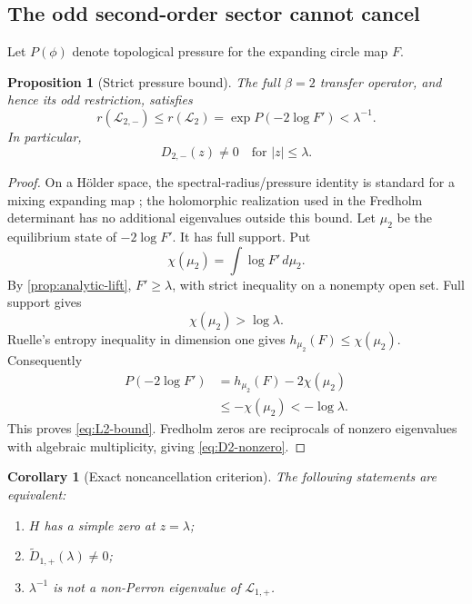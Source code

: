 \documentclass[11pt]{article}
\newtheorem{proposition}[theorem]{Proposition}
\newtheorem{corollary}[theorem]{Corollary}
\theoremstyle{definition}
\theoremstyle{remark}
\newcommand{\cL}{\mathcal L}
\begin{document}
\subsection{The odd second-order sector cannot cancel}

Let $P(\phi)$ denote topological pressure for the expanding circle map $F$.

\begin{proposition}[Strict pressure bound]
\label{prop:pressure-bound}
The full $\beta=2$ transfer operator, and hence its odd restriction, satisfies
\begin{equation}\label{eq:L2-bound}
 r(\cL_{2,-})\le r(\cL_2)
 =\exp P(-2\log F')<\lambda^{-1}.
\end{equation}
In particular,
\begin{equation}\label{eq:D2-nonzero}
 D_{2,-}(z)\ne0\quad\text{for }|z|\le\lambda.
\end{equation}
\end{proposition}

\begin{proof}
On a H\"older space, the spectral-radius/pressure identity is standard for a
mixing expanding map \citep{Ruelle1989,Baladi2000}; the holomorphic
realization used in the Fredholm determinant has no additional eigenvalues
outside this bound.  Let $\mu_2$ be the
equilibrium state of $-2\log F'$.  It has full support.  Put
\begin{equation}\label{eq:chi}
 \chi(\mu_2)=\int\log F'\,d\mu_2.
\end{equation}
By \cref{prop:analytic-lift}, $F'\ge\lambda$, with strict inequality on a
nonempty open set.  Full support gives
\begin{equation}\label{eq:strict-chi}
 \chi(\mu_2)>\log\lambda.
\end{equation}
Ruelle's entropy inequality in dimension one gives
$h_{\mu_2}(F)\le\chi(\mu_2)$.  Consequently
\begin{align}
 P(-2\log F')
 &=h_{\mu_2}(F)-2\chi(\mu_2)\nonumber\\
 &\le-\chi(\mu_2)<-\log\lambda.
 \label{eq:pressure-chain}
\end{align}
This proves \eqref{eq:L2-bound}.  Fredholm zeros are reciprocals of nonzero
eigenvalues with algebraic multiplicity, giving \eqref{eq:D2-nonzero}.
\end{proof}

\begin{corollary}[Exact noncancellation criterion]
\label{cor:noncancellation}
The following statements are equivalent:
\begin{enumerate}[label=(\roman*),leftmargin=2.8em]
 \item $H$ has a simple zero at $z=\lambda$;
 \item $\widetilde D_{1,+}(\lambda)\ne0$;
 \item $\lambda^{-1}$ is not a non-Perron eigenvalue of $\cL_{1,+}$.
\end{enumerate}
\end{corollary}
\end{document}
